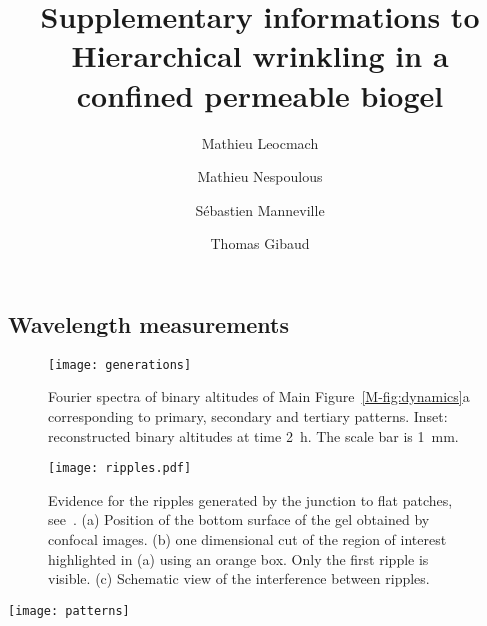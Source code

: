 \documentclass[twocolumn,superscriptaddress,showpacs,preprintnumbers,
amsmath,amssymb,prl]{revtex4-1}
\begin{document}
\title{Supplementary informations to Hierarchical wrinkling in a confined permeable biogel}
\author{Mathieu Leocmach}
\author{Mathieu Nespoulous}
\author{Sébastien Manneville}
\author{Thomas Gibaud}

\maketitle



\subsection*{Wavelength measurements}

\begin{figure}
	\texttt{[image: generations]}%
	\caption{Fourier spectra of binary altitudes of Main Figure~\ref{M-fig:dynamics}a corresponding to primary, secondary and tertiary patterns. Inset: reconstructed binary altitudes at time \SI{2}{\hour}. The scale bar is \SI{1}{\milli\metre}.}%
	\label{fig:generations}%
\end{figure}

\begin{figure}
\texttt{[image: ripples.pdf]}
\caption{Evidence for the ripples generated by the junction to flat patches, see~\cite{LeGoff2014}. (a) Position of the bottom surface of the gel obtained by confocal images. (b) one dimensional cut of the region of interest highlighted in (a) using an orange box. Only the first ripple is visible. (c) Schematic view of the interference between ripples.}
\label{fig:ripples}
\end{figure}

\begin{figure*}
	\texttt{[image: patterns]}
	\caption{Patterns corresponding to the samples of Supplementary Table~\ref{tab:data}. (a-d) increasing cell thickness. (e-f) larger solid content. (g-i) increasing glycerol content. All pictures are stitching of fluorescent microscopy images except (c,e) which are details of reflected light macroscope images. The scale is common to all panels (scale bar \SI{1}{\milli\metre}). Arrows show the measured primary wavelength.}
	\label{fig:patterns}
\end{figure*}
\end{document}
